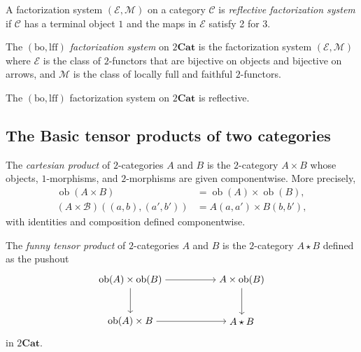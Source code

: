 \documentclass{tac}
\begin{document}
\begin{definition}
A factorization system $(\mathcal{E},\mathcal{M})$ on a category $\mathcal{C}$ is \emph{reflective factorization system} if $\mathcal{C}$ has a terminal object $1$ and the maps in $\mathcal{E}$ satisfy 2 for 3.
\end{definition}

\begin{definition}
The \emph{$(\mathrm{bo},\mathrm{lff})$ factorization system} on $2\mathbf{Cat}$ is the
factorization system $(\mathcal{E},\mathcal{M})$ where $\mathcal{E}$ is
the class of $2$-functors that are bijective on objects and bijective on
arrows, and $\mathcal{M}$ is the class of locally full and faithful
$2$-functors.
\end{definition}

The $(\mathrm{bo},\mathrm{lff})$ factorization system on $2\mathbf{Cat}$ is reflective.
\subsection*{The Basic tensor products of two categories}
\begin{definition}
The \emph{cartesian product} of $2$-categories $A$ and
$B$ is the $2$-category $A\times B$ whose
objects, $1$-morphisms, and $2$-morphisms are given componentwise. More
precisely,
\begin{align*}
\operatorname{ob}(A\times B)
    &=\operatorname{ob}(A)\times\operatorname{ob}(B),\\
(A\times\mathcal B)((a,b),(a',b'))
    &=A(a,a')\times B(b,b'),
\end{align*}
with identities and composition defined componentwise.
\end{definition}

\begin{definition}
The \emph{funny tensor product} of $2$-categories $A$ and
$B$ is the $2$-category $A\star B$ defined
as the pushout
\[
\begin{tikzpicture}[baseline=(current bounding box.center)]
\node (TL) at (0,1.5)
{$\operatorname{ob}(A)\times\operatorname{ob}(B)$};
\node (TR) at (4,1.5)
{$A\times\operatorname{ob}(B)$};
\node (BL) at (0,0)
{$\operatorname{ob}(A)\times B$};
\node (BR) at (4,0)
{$A\star B$};

\draw[->] (TL) -- (TR);
\draw[->] (TL) -- (BL);
\draw[->] (TR) -- (BR);
\draw[->] (BL) -- (BR);
\end{tikzpicture}
\]
in $2\mathbf{Cat}$.
\end{definition}
\end{document}

